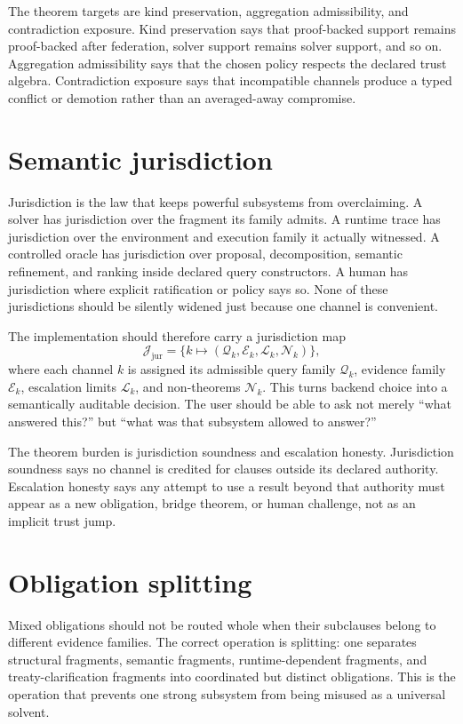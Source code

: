 \documentclass[11pt]{report}
\begin{document}
The theorem targets are kind preservation, aggregation admissibility, and contradiction exposure. Kind preservation says that proof-backed support remains proof-backed after federation, solver support remains solver support, and so on. Aggregation admissibility says that the chosen policy respects the declared trust algebra. Contradiction exposure says that incompatible channels produce a typed conflict or demotion rather than an averaged-away compromise.
\section{Semantic jurisdiction}
Jurisdiction is the law that keeps powerful subsystems from overclaiming. A solver has jurisdiction over the fragment its family admits. A runtime trace has jurisdiction over the environment and execution family it actually witnessed. A controlled oracle has jurisdiction over proposal, decomposition, semantic refinement, and ranking inside declared query constructors. A human has jurisdiction where explicit ratification or policy says so. None of these jurisdictions should be silently widened just because one channel is convenient.

The implementation should therefore carry a jurisdiction map
\[
\mathcal{J}_{\mathrm{jur}} = \{ k \mapsto (\mathcal{Q}_k, \mathcal{E}_k, \mathcal{L}_k, \mathcal{N}_k) \},
\]
where each channel $k$ is assigned its admissible query family $\mathcal{Q}_k$, evidence family $\mathcal{E}_k$, escalation limits $\mathcal{L}_k$, and non-theorems $\mathcal{N}_k$. This turns backend choice into a semantically auditable decision. The user should be able to ask not merely ``what answered this?'' but ``what was that subsystem allowed to answer?''

The theorem burden is jurisdiction soundness and escalation honesty. Jurisdiction soundness says no channel is credited for clauses outside its declared authority. Escalation honesty says any attempt to use a result beyond that authority must appear as a new obligation, bridge theorem, or human challenge, not as an implicit trust jump.
\section{Obligation splitting}
Mixed obligations should not be routed whole when their subclauses belong to different evidence families. The correct operation is splitting: one separates structural fragments, semantic fragments, runtime-dependent fragments, and treaty-clarification fragments into coordinated but distinct obligations. This is the operation that prevents one strong subsystem from being misused as a universal solvent.
\end{document}
